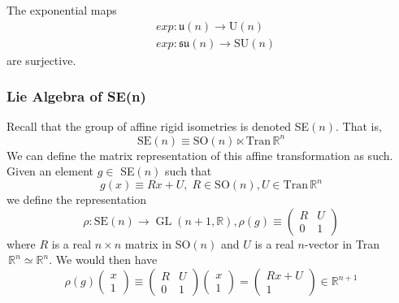 \documentclass{article}
\DeclareMathOperator{\GL}{GL}
\begin{document}
      \begin{theorem}
      The exponential maps 
      \begin{align*}
          & exp: \mathfrak{u}(n) \longrightarrow \text{U}(n) \\
          & exp: \mathfrak{su}(n) \longrightarrow \text{SU}(n)
      \end{align*}
      are surjective. 
      \end{theorem}

    \subsubsection{Lie Algebra of SE(n)}

      Recall that the group of affine rigid isometries is denoted SE$(n)$. That is, 
      \[\text{SE}(n) \equiv \text{SO}(n) \ltimes \text{Tran}\,\mathbb{R}^n\]
      We can define the matrix representation of this affine transformation as such. Given an element $g \in$ SE$(n)$ such that
      \[g(x) \equiv R x + U, \; R \in \text{SO}(n), U \in \text{Tran}\, \mathbb{R}^n \]
      we define the representation
      \[\rho: \text{SE}(n) \longrightarrow \GL(n+1, \mathbb{R}), \rho(g) \equiv \begin{pmatrix}
      R&U\\0&1
      \end{pmatrix}\]
      where $R$ is a real $n\times n$ matrix in SO$(n)$ and $U$ is a real $n$-vector in Tran$\,\mathbb{R}^n \simeq \mathbb{R}^n$. We would then have
      \[\rho(g) \begin{pmatrix}
      x\\1
      \end{pmatrix} \equiv \begin{pmatrix}
      R&U\\0&1
      \end{pmatrix} \begin{pmatrix}
      x\\1
      \end{pmatrix} = \begin{pmatrix}
      R x + U\\1
      \end{pmatrix} \in \mathbb{R}^{n+1}\]
\end{document}
